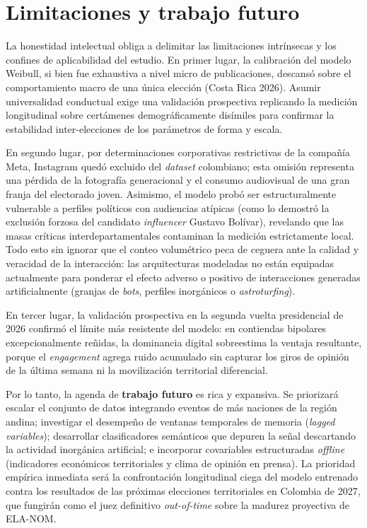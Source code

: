 \section{Limitaciones y trabajo futuro}

La honestidad intelectual obliga a delimitar las limitaciones intrínsecas y los confines de aplicabilidad del estudio. En primer lugar, la calibración del modelo Weibull, si bien fue exhaustiva a nivel micro de publicaciones, descansó sobre el comportamiento macro de una única elección (Costa Rica 2026). Asumir universalidad conductual exige una validación prospectiva replicando la medición longitudinal sobre certámenes demográficamente disímiles para confirmar la estabilidad inter-elecciones de los parámetros de forma y escala.

En segundo lugar, por determinaciones corporativas restrictivas de la compañía Meta, Instagram quedó excluido del \textit{dataset} colombiano; esta omisión representa una pérdida de la fotografía generacional y el consumo audiovisual de una gran franja del electorado joven. Asimismo, el modelo probó ser estructuralmente vulnerable a perfiles políticos con audiencias atípicas (como lo demostró la exclusión forzosa del candidato \textit{influencer} Gustavo Bolívar), revelando que las masas críticas interdepartamentales contaminan la medición estrictamente local. Todo esto sin ignorar que el conteo volumétrico peca de ceguera ante la calidad y veracidad de la interacción: las arquitecturas modeladas no están equipadas actualmente para ponderar el efecto adverso o positivo de interacciones generadas artificialmente (granjas de \textit{bots}, perfiles inorgánicos o \textit{astroturfing}).

En tercer lugar, la validación prospectiva en la segunda vuelta presidencial de 2026 confirmó el límite más resistente del modelo: en contiendas bipolares excepcionalmente reñidas, la dominancia digital sobreestima la ventaja resultante, porque el \textit{engagement} agrega ruido acumulado sin capturar los giros de opinión de la última semana ni la movilización territorial diferencial.

Por lo tanto, la agenda de \textbf{trabajo futuro} es rica y expansiva. Se priorizará escalar el conjunto de datos integrando eventos de más naciones de la región andina; investigar el desempeño de ventanas temporales de memoria (\textit{lagged variables}); desarrollar clasificadores semánticos que depuren la señal descartando la actividad inorgánica artificial; e incorporar covariables estructuradas \textit{offline} (indicadores económicos territoriales y clima de opinión en prensa). La prioridad empírica inmediata será la confrontación longitudinal ciega del modelo entrenado contra los resultados de las próximas elecciones territoriales en Colombia de 2027, que fungirán como el juez definitivo \textit{out-of-time} sobre la madurez proyectiva de ELA-NOM.
